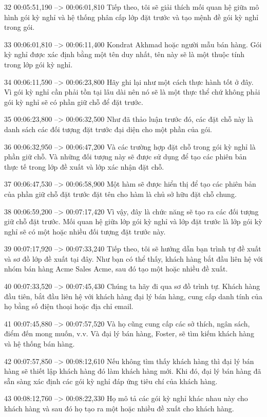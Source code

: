 32
00:05:51,190 --> 00:06:01,810
Tiếp theo, tôi sẽ giải thích mối quan hệ giữa mô hình gói kỳ nghỉ và hệ thống phân cấp lớp đặt trước và tạo mệnh đề gói kỳ nghỉ trong gói.

33
00:06:01,810 --> 00:06:11,400
Kondrat Akhmad hoặc người mẫu bán hàng.  Gói kỳ nghỉ được xác định bằng một tên duy nhất, tên này sẽ là một thuộc tính trong lớp gói kỳ nghỉ.

34
00:06:11,590 --> 00:06:23,800
Hãy ghi lại như một cách thực hành tốt ở đây.  Vì gói kỳ nghỉ cần phải tồn tại lâu dài nên nó sẽ là một thực thể chứ không phải gói kỳ nghỉ sẽ có phần giữ chỗ để đặt trước.

35
00:06:23,800 --> 00:06:32,500
Như đã thảo luận trước đó, các đặt chỗ này là danh sách các đối tượng đặt trước đại diện cho một phần của gói.

36
00:06:32,950 --> 00:06:47,200
Và các trường hợp đặt chỗ trong gói kỳ nghỉ là phần giữ chỗ.  Và những đối tượng này sẽ được sử dụng để tạo các phiên bản thực tế trong lớp đề xuất và lớp xác nhận đặt chỗ.

37
00:06:47,530 --> 00:06:58,900
Một hàm sẽ được hiển thị để tạo các phiên bản của phần giữ chỗ đặt trước đặt tên cho hàm là chủ sở hữu đặt chỗ chung.

38
00:06:59,200 --> 00:07:17,420
Vì vậy, đây là chức năng sẽ tạo ra các đối tượng giữ chỗ đặt trước.  Mối quan hệ giữa lớp gói kỳ nghỉ và lớp đặt trước là lớp gói kỳ nghỉ sẽ có một hoặc nhiều đối tượng đặt trước này.

39
00:07:17,920 --> 00:07:33,240
Tiếp theo, tôi sẽ hướng dẫn bạn trình tự đề xuất và sơ đồ lớp đề xuất tại đây.  Như bạn có thể thấy, khách hàng bắt đầu liên hệ với nhóm bán hàng Acme Sales Acme, sau đó tạo một hoặc nhiều đề xuất.

40
00:07:33,520 --> 00:07:45,430
Chúng ta hãy đi qua sơ đồ trình tự.  Khách hàng đầu tiên, bắt đầu liên hệ với khách hàng đại lý bán hàng, cung cấp danh tính của họ bằng số điện thoại hoặc địa chỉ email.

41
00:07:45,880 --> 00:07:57,520
Và họ cũng cung cấp các sở thích, ngân sách, điểm đến mong muốn, v.v. Và đại lý bán hàng, Foster, sẽ tìm kiếm khách hàng và hệ thống bán hàng.

42
00:07:57,850 --> 00:08:12,610
Nếu không tìm thấy khách hàng thì đại lý bán hàng sẽ thiết lập khách hàng đó làm khách hàng mới.  Khi đó, đại lý bán hàng đã sẵn sàng xác định các gói kỳ nghỉ đáp ứng tiêu chí của khách hàng.

43
00:08:12,760 --> 00:08:22,330
Họ mô tả các gói kỳ nghỉ khác nhau này cho khách hàng và sau đó họ tạo ra một hoặc nhiều đề xuất cho khách hàng.

